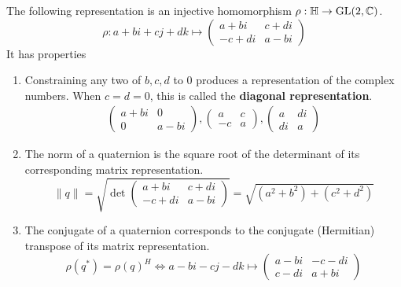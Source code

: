   \begin{theorem}
    \label{thm:diagonal-representation-of-h}
    The following representation is an injective homomorphism $\rho: \mathbb{H} \to \operatorname{GL}(2, \mathbb{C})$. 
    \begin{equation}
      \rho: a + bi + cj + dk \mapsto \begin{pmatrix}
      a+bi & c+ di \\ -c + di & a - bi
      \end{pmatrix}
    \end{equation}
    It has properties
    \begin{enumerate}
      \item Constraining any two of $b, c, d$ to $0$ produces a representation of the complex numbers. When $c = d = 0$, this is called the \textbf{diagonal representation}. 
      \begin{align*}
        \begin{pmatrix}
        a+bi & 0 \\ 0 & a-bi
        \end{pmatrix},  \begin{pmatrix}
        a & c \\ -c & a
        \end{pmatrix},  \begin{pmatrix}
        a & di \\ di & a
        \end{pmatrix}
      \end{align*}
      \item The norm of a quaternion is the square root of the determinant of its corresponding matrix representation. 
        \begin{equation}
          \|q\| = \sqrt{\det \begin{pmatrix}
          a+bi & c+di \\ -c+di & a-bi
          \end{pmatrix}} = \sqrt{(a^2 + b^2) + (c^2 + d^2)}
        \end{equation}
      \item The conjugate of a quaternion corresponds to the conjugate (Hermitian) transpose of its matrix representation. 
        \begin{equation}
          \rho(q^*) = \rho(q)^H \iff a-bi-cj-dk \mapsto \begin{pmatrix}
          a-bi & -c-di \\ c-di & a+bi
          \end{pmatrix}

\end{equation}
\end{enumerate}
\end{theorem}
